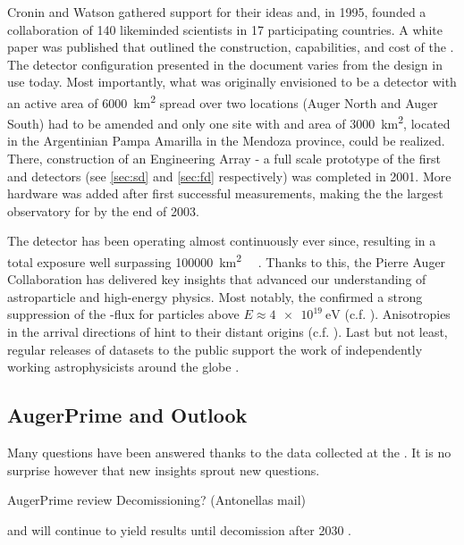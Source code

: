 Cronin and Watson gathered support for their ideas and, in 1995, founded a 
collaboration of 140 likeminded scientists in 17 participating countries. A 
white paper was published that outlined the construction, capabilities, and 
cost of the \PAO \cite{theaugercollaborationPierreAugerObservatory}. The 
detector configuration presented in the document varies from the design in use 
today. Most importantly, what was originally envisioned to be a detector with an
active area of \SI{6000}{\km\squared} spread over two locations (Auger North and
Auger South) had to be amended and only one site with and area of 
\SI{3000}{\km\squared}, located in the Argentinian Pampa Amarilla in the Mendoza
province, could be realized. There, construction of an Engineering Array - a 
full scale prototype of the first \SD and \FD detectors (see \cref{sec:sd} and 
\cref{sec:fd} respectively) was completed in 2001. More hardware was added after
first successful measurements, making the \PAO the largest observatory for \CRs 
by the end of 2003.

The detector has been operating almost continuously ever since, resulting in a 
total exposure well surpassing \SI{100000}{\km\squared\sr\year} 
\cite{aabPierreAugerObservatory2020}. Thanks to this, the Pierre Auger 
Collaboration has delivered key insights that advanced our understanding of 
astroparticle and high-energy physics. Most notably, the \PAO confirmed a 
strong suppression of the \CR-flux for particles above 
$E\approx\SI{4e19}{\eV}$ \cite{yamamotoUHECRSpectrumMeasured2007} (c.f. 
). Anisotropies in the arrival directions of \UHECRs 
hint to their distant origins
\cite{thepierreaugercollaborationObservationLargescaleAnisotropy2017} (c.f. 
). Last but not least, regular releases of datasets to
the public support the work of independently working astrophysicists around the 
globe \cite{pierreaugercollaborationPierreAugerObservatory2025}.

\subsection{AugerPrime and Outlook}
\label{ssec:augerprime-and-outlook}

Many questions have been answered thanks to the data collected at the \PAO. It
is no surprise however that new insights sprout new questions. 

AugerPrime review
Decomissioning? (Antonellas mail)


\cite{abraham_properties_2004} and will continue to yield results until 
decomission after 2030 \cite{castellina_outcome_2023}.

